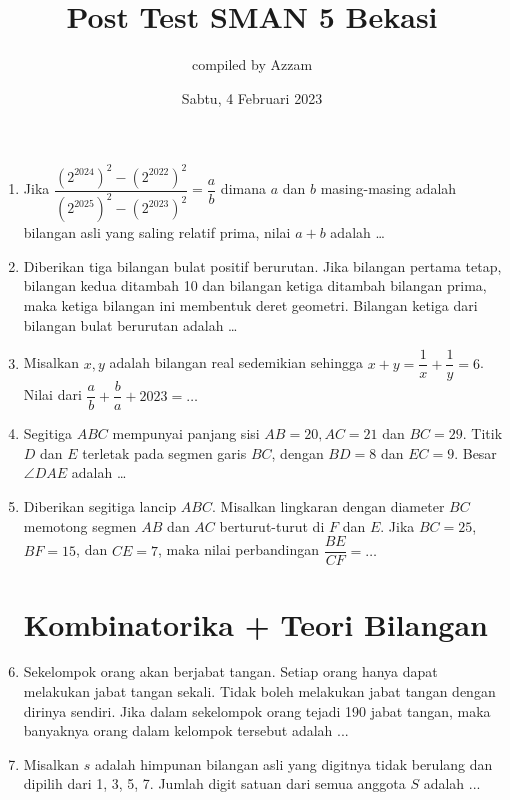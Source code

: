 \documentclass[11pt]{scrartcl}
\title{Post Test SMAN 5 Bekasi}
\author{compiled by Azzam}
\date{Sabtu, 4 Februari 2023}
\begin{document}
\maketitle
\begin{enumerate}
    \section{Aljabar + Geometri}
    \item Jika $\dfrac{(2^{2024})^2-(2^{2022})^2}{(2^{2025})^2-(2^{2023})^2}=\dfrac{a}{b}$ dimana $a$ dan $b$ masing-masing adalah bilangan asli yang saling relatif prima, nilai $a+b$ adalah \dots

    \item Diberikan tiga bilangan bulat positif berurutan. Jika bilangan pertama tetap, bilangan kedua ditambah 10 dan bilangan ketiga ditambah bilangan prima, maka ketiga bilangan ini membentuk deret geometri. Bilangan ketiga dari bilangan bulat berurutan adalah \dots

    \item Misalkan $x,y$ adalah bilangan real sedemikian sehingga $x+y=\dfrac{1}{x}+\dfrac{1}{y}=6$. Nilai dari $\dfrac{a}{b}+\dfrac{b}{a}+2023=\dots$

    \item Segitiga $ABC$ mempunyai panjang sisi $AB = 20, AC = 21$ dan $BC = 29$. Titik $D$ dan $E$ terletak pada segmen garis $BC$, dengan $BD = 8$ dan $EC = 9$. Besar $\angle DAE$ adalah \dots

    \item Diberikan segitiga lancip $ABC$. Misalkan lingkaran dengan diameter $BC$ memotong segmen $AB$ dan $AC$ berturut-turut di $F$ dan $E$. Jika $BC=25$, $BF=15$, dan $CE=7$, maka nilai perbandingan $\dfrac{BE}{CF}=\dots$

    \newpage
    \section{Kombinatorika + Teori Bilangan}
    \item Sekelompok orang akan berjabat tangan. Setiap orang hanya dapat melakukan jabat tangan sekali. Tidak boleh melakukan jabat tangan dengan dirinya sendiri. Jika dalam sekelompok orang tejadi 190 jabat tangan, maka banyaknya orang dalam kelompok tersebut adalah ...

    \item Misalkan $s$ adalah himpunan bilangan asli yang digitnya tidak berulang dan dipilih dari 1, 3, 5, 7. Jumlah digit satuan dari semua anggota $S$ adalah ...


\end{enumerate}
\end{document}
